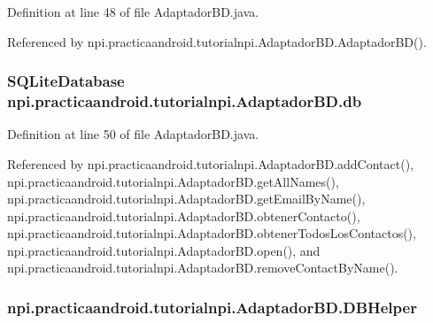 Definition at line 48 of file Adaptador\-B\-D.\-java.



Referenced by npi.\-practicaandroid.\-tutorialnpi.\-Adaptador\-B\-D.\-Adaptador\-B\-D().

\hypertarget{classnpi_1_1practicaandroid_1_1tutorialnpi_1_1_adaptador_b_d_a7bda122c7e3ef7889ebe3f14ee6a6992}{
\subsubsection[{db}]{\setlength{\rightskip}{0pt plus 5cm}S\-Q\-Lite\-Database npi.\-practicaandroid.\-tutorialnpi.\-Adaptador\-B\-D.\-db\hspace{0.3cm}{\ttfamily [private]}}}\label{classnpi_1_1practicaandroid_1_1tutorialnpi_1_1_adaptador_b_d_a7bda122c7e3ef7889ebe3f14ee6a6992}


Definition at line 50 of file Adaptador\-B\-D.\-java.



Referenced by npi.\-practicaandroid.\-tutorialnpi.\-Adaptador\-B\-D.\-add\-Contact(), npi.\-practicaandroid.\-tutorialnpi.\-Adaptador\-B\-D.\-get\-All\-Names(), npi.\-practicaandroid.\-tutorialnpi.\-Adaptador\-B\-D.\-get\-Email\-By\-Name(), npi.\-practicaandroid.\-tutorialnpi.\-Adaptador\-B\-D.\-obtener\-Contacto(), npi.\-practicaandroid.\-tutorialnpi.\-Adaptador\-B\-D.\-obtener\-Todos\-Los\-Contactos(), npi.\-practicaandroid.\-tutorialnpi.\-Adaptador\-B\-D.\-open(), and npi.\-practicaandroid.\-tutorialnpi.\-Adaptador\-B\-D.\-remove\-Contact\-By\-Name().

\hypertarget{classnpi_1_1practicaandroid_1_1tutorialnpi_1_1_adaptador_b_d_ac3e24d1a7aeeb4bc0fe78f054c42752b}{
\subsubsection[{D\-B\-Helper}]{ npi.\-practicaandroid.\-tutorialnpi.\-Adaptador\-B\-D.\-D\-B\-Helper\hspace{0.3cm}{\ttfamily [private]}}}\label{classnpi_1_1practicaandroid_1_1tutorialnpi_1_1_adaptador_b_d_ac3e24d1a7aeeb4bc0fe78f054c42752b}


